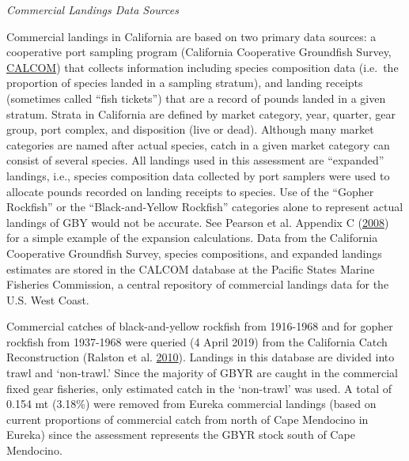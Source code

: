\documentclass[12pt,]{article}
\begin{document}
\emph{Commercial Landings Data Sources}

Commercial landings in California are based on two primary data sources:
a cooperative port sampling program (California Cooperative Groundfish
Survey, \href{https://calcom.psmfc.org/}{CALCOM}) that collects
information including species composition data (i.e.~the proportion of
species landed in a sampling stratum), and landing receipts (sometimes
called ``fish tickets'') that are a record of pounds landed in a given
stratum. Strata in California are defined by market category, year,
quarter, gear group, port complex, and disposition (live or dead).
Although many market categories are named after actual species, catch in
a given market category can consist of several species. All landings
used in this assessment are ``expanded'' landings, i.e., species
composition data collected by port samplers were used to allocate pounds
recorded on landing receipts to species. Use of the ``Gopher Rockfish''
or the ``Black-and-Yellow Rockfish'' categories alone to represent
actual landings of GBY would not be accurate. See Pearson et al.
Appendix C (\protect\hyperlink{ref-Pearson2008}{2008}) for a simple
example of the expansion calculations. Data from the California
Cooperative Groundfish Survey, species compositions, and expanded
landings estimates are stored in the CALCOM database at the Pacific
States Marine Fisheries Commission, a central repository of commercial
landings data for the U.S. West Coast.

Commercial catches of black-and-yellow rockfish from 1916-1968 and for
gopher rockfish from 1937-1968 were queried (4 April 2019) from the
California Catch Reconstruction (Ralston et al.
\protect\hyperlink{ref-Ralston2010}{2010}). Landings in this database
are divided into trawl and `non-trawl.' Since the majority of GBYR are
caught in the commercial fixed gear fisheries, only estimated catch in
the `non-trawl' was used. A total of 0.154 mt (3.18\%) were removed from
Eureka commercial landings (based on current proportions of commercial
catch from north of Cape Mendocino in Eureka) since the assessment
represents the GBYR stock south of Cape Mendocino.
\end{document}

